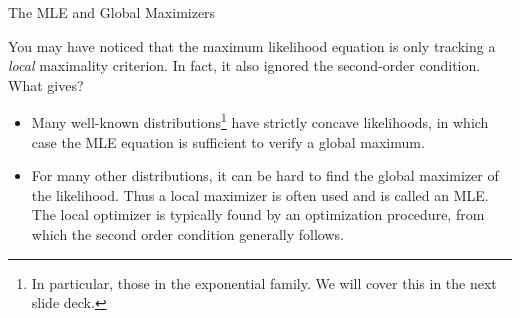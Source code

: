 \documentclass[10pt]{beamer}
\renewcommand{\it}[1]{\textit{{#1}}}
\begin{document}
\begin{frame}{The MLE and Global Maximizers}

You may have noticed that the maximum likelihood equation is only tracking a \it{local} maximality criterion.  In fact, it also ignored the second-order condition. What gives?

\begin{itemize}
\item Many well-known distributions\footnote{In particular, those in the exponential family.  We will cover this in the next slide deck.} have strictly concave likelihoods, in which case the MLE equation is sufficient to verify a global maximum. 
\item For many other distributions, it can be hard to find the global maximizer of the likelihood. Thus a local maximizer is often used and is called an MLE.   The local optimizer is typically found by an optimization procedure, from which the second order condition generally follows.
\end{itemize}

\end{frame}
\end{document}
